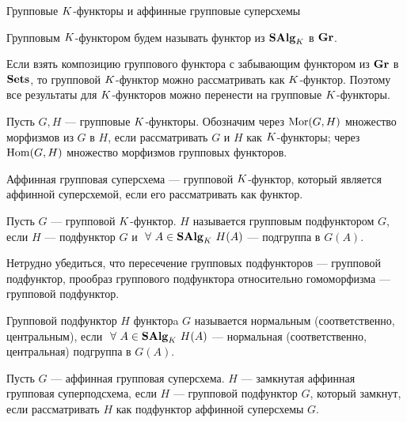 \begin{subsection}{Групповые $K$-функторы и аффинные групповые суперсхемы}
  \begin{definition}
    Групповым $K$-функтором будем называть функтор из $ \mathbf{SAlg}_K $ в $ \mathbf{Gr} $.
  \end{definition}
  Если взять композицию группового функтора с забывающим функтором из $ \mathbf{Gr} $ в $ \mathbf{Sets} $,
  то групповой $K$-функтор можно рассматривать как $K$-функтор. Поэтому все результаты
  для $K$-функторов можно перенести на групповые $K$-функторы.

  Пусть $ G, H $ --- групповые $K$-функторы. Обозначим через
  $ \mathrm{Mor}(G, H) $ множество морфизмов из $ G $ в $ H $, если рассматривать $ G $ и $ H $
  как $K$-функторы;
  через $ \mathrm{Hom}(G, H) $ множество морфизмов групповых функторов.

  \begin{definition}
    Аффинная групповая суперсхема --- групповой $K$-функтор,
    который является аффинной суперсхемой, если его рассматривать как функтор.
  \end{definition}

  \begin{definition}
    Пусть $ G $ --- групповой $K$-функтор. $ H $ называется групповым подфунктором
    $ G $, если $ H $ --- подфунктор $ G $ и $ ~\forall ~A \in \mathbf{SAlg}_K ~H(A) $ ---
    подгруппа в $ G(A) $.
  \end{definition}

  Нетрудно убедиться, что пересечение групповых подфункторов --- групповой подфунктор,
  прообраз группового подфунктора относительно гомоморфизма --- групповой подфунктор.

  \begin{definition}
    Групповой подфунктор $ H $ функторa $ G $ называется нормальным
    (соответственно, центральным), если $ ~\forall ~A \in \mathbf{SAlg}_K ~H(A) $ --- нормальная
    (соответственно, центральная) подгруппа в $ G(A) $.
  \end{definition}

  \begin{definition}
    Пусть $ G $ --- аффинная групповая суперсхема. $ H $ --- замкнутая аффинная
    групповая суперподсхема, если $ H $ --- групповой подфунктор $ G $, который
    замкнут, если рассматривать $ H $ как подфунктор аффинной суперсхемы $ G $.
  \end{definition}

\end{subsection}


